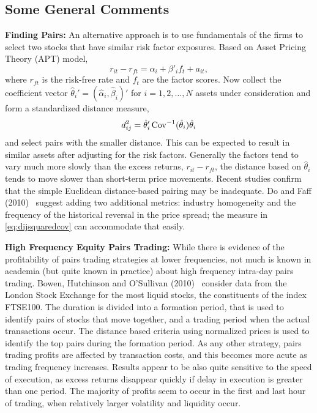 \subsection{Some General Comments}


\noindent\textbf{Finding Pairs:} An alternative approach is to use fundamentals of the firms to select two stocks that have similar risk factor exposures. Based on Asset Pricing Theory (APT) model,
	\begin{equation}
	r_{it} - r_{ft} = \alpha_i + \beta'_if_t + a_{it},
	\end{equation}
where $r_{ft}$ is the risk-free rate and $f_t$ are the factor scores. Now collect the coefficient vector $\hat{\theta}_i' = (\hat{\alpha}_i, \hat{\beta}_i)'$ for $i = 1, 2, \ldots, N$ assets under consideration and form a standardized distance measure,
	\begin{equation} \label{eq:dijsquaredcov}
	d_{ij}^2 = \hat{\theta}_i' \cov^{-1}(\hat{\theta}_i)\hat{\theta}_i
	\end{equation}
and select pairs with the smaller distance. This can be expected to result in similar assets after adjusting for the risk factors. Generally the factors tend to vary much more slowly than the excess returns, $r_{it} - r_{ft}$, the distance based on $\hat{\theta}_i$ tends to move slower than short-term price movements. Recent studies confirm that the simple Euclidean distance-based pairing may be inadequate. Do and Faff (2010)~\cite{do2010does} suggest adding two additional metrics: industry homogeneity and the frequency of the historical reversal in the price spread; the measure in \eqref{eq:dijsquaredcov} can accommodate that easily. \twomedskip


\noindent\textbf{High Frequency Equity Pairs Trading:} While there is evidence of the profitability of pairs trading strategies at lower frequencies, not much is known in academia (but quite known in practice) about high frequency intra-day pairs trading. Bowen, Hutchinson and O'Sullivan (2010)~\cite{bho} consider data from the London Stock Exchange for the most liquid stocks, the constituents of the index FTSE100. The duration is divided into a formation period, that is used to identify pairs of stocks that move together, and a trading period when the actual transactions occur. The distance based criteria using normalized prices is used to identify the top pairs during the formation period. As any other strategy, pairs trading profits are affected by transaction costs, and this becomes more acute as trading frequency increases. Results appear to be also quite sensitive to the speed of execution, as excess returns disappear quickly if delay in execution is greater than one period. The majority of profits seem to occur in the first and last hour of trading, when relatively larger volatility and liquidity occur.


